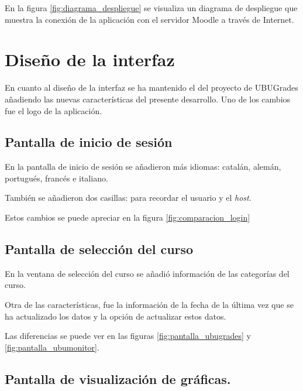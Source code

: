 En la figura \ref{fig:diagrama_despliegue} se visualiza un diagrama de despliegue que muestra la conexión de la aplicación con el servidor Moodle a través de Internet.




\section{Diseño de la interfaz}
En cuanto al diseño de la interfaz se ha mantenido el del proyecto de UBUGrades añadiendo las nuevas características del presente desarrollo. Uno de los cambios fue el logo de la aplicación.


\subsection{Pantalla de inicio de sesión}
En la pantalla de inicio de sesión se añadieron más idiomas: catalán, alemán, portugués, francés e italiano.

También se añadieron dos casillas: para recordar el usuario y el \textit{host}. 

Estos cambios se puede apreciar en la figura \ref{fig:comparacion_login}

\subsection{Pantalla de selección del curso}

En la ventana de selección del curso se añadió información de las categorías del curso.

Otra de las características, fue la información de la fecha de la última vez que se ha actualizado los datos y la opción de actualizar estos datos.

Las diferencias se puede ver en las  figuras \ref{fig:pantalla_ubugrades} y \ref{fig:pantalla_ubumonitor}.



\subsection{Pantalla de visualización de gráficas.}

